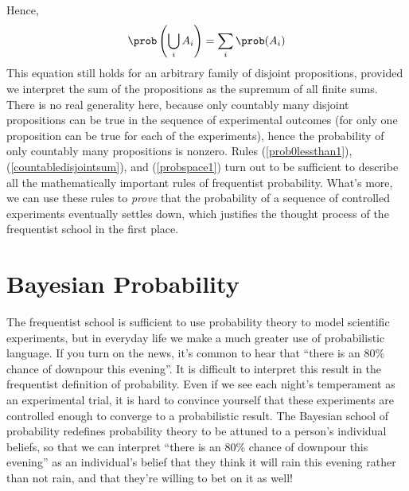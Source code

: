 %
Hence,
%
\begin{equation}\label{countabledisjointsum} \prob \left(\bigcup_i A_i \right) = \sum_i \prob(A_i) \end{equation}
%
This equation still holds for an arbitrary family of disjoint propositions, provided we interpret the sum of the propositions as the supremum of all finite sums. There is no real generality here, because only countably many disjoint propositions can be true in the sequence of experimental outcomes (for only one proposition can be true for each of the experiments), hence the probability of only countably many propositions is nonzero. Rules (\ref{prob0lessthan1}), (\ref{countabledisjointsum}), and (\ref{probspace1}) turn out to be sufficient to describe all the mathematically important rules of frequentist probability. What's more, we can use these rules to {\it prove} that the probability of a sequence of controlled experiments eventually settles down, which justifies the thought process of the frequentist school in the first place.

\section{Bayesian Probability}

The frequentist school is sufficient to use probability theory to model scientific experiments, but in everyday life we make a much greater use of probabilistic language. If you turn on the news, it's common to hear that ``there is an 80\% chance of downpour this evening''. It is difficult to interpret this result in the frequentist definition of probability. Even if we see each night's temperament as an experimental trial, it is hard to convince yourself that these experiments are controlled enough to converge to a probabilistic result. The Bayesian school of probability redefines probability theory to be attuned to a person's individual beliefs, so that we can interpret ``there is an 80\% chance of downpour this evening'' as an individual's belief that they think it will rain this evening rather than not rain, and that they're willing to bet on it as well!

